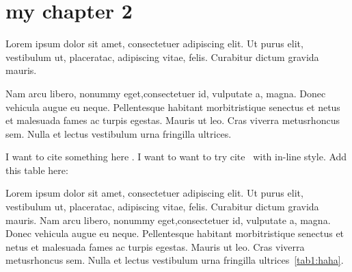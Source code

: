 \section{my chapter 2}

Lorem ipsum dolor sit amet, consectetuer adipiscing elit.  Ut purus elit, vestibulum ut, placeratac,  adipiscing vitae,  felis.   Curabitur dictum gravida mauris.  

Nam arcu libero,  nonummy eget,consectetuer id, vulputate a, magna. Donec vehicula augue eu neque. Pellentesque habitant morbitristique senectus et netus et malesuada fames ac turpis egestas. Mauris ut leo. Cras viverra metusrhoncus sem.  Nulla et lectus vestibulum urna fringilla ultrices. 

I want to cite something here \parencite{fennell2018predicting}. I want to want to try cite~\textcite{zuo2019standing} with in-line style.
Add this table here:

Lorem ipsum dolor sit amet, consectetuer adipiscing elit.  Ut purus elit, vestibulum ut, placeratac,  adipiscing vitae,  felis.   Curabitur dictum gravida mauris.  
Nam arcu libero,  nonummy eget,consectetuer id, vulputate a, magna. Donec vehicula augue eu neque. Pellentesque habitant morbitristique senectus et netus et malesuada fames ac turpis egestas. Mauris ut leo. Cras viverra metusrhoncus sem.  Nulla et lectus vestibulum urna fringilla ultrices~\cref{tab1:haha}. 

